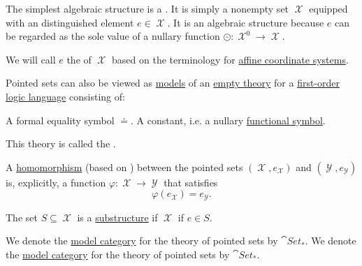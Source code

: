 \begin{definition}\label{def:pointed_set}
  The simplest algebraic structure is a . It is simply a nonempty set \( \mscrX \) equipped with an distinguished element \( e \in \mscrX \). It is an algebraic structure because \( e \) can be regarded as the sole value of a nullary function \( \odot: \mscrX^0 \to \mscrX \).

  We will call \( e \) the  of \( \mscrX \) based on the terminology for \hyperref[def:euclidean_plane_coordinate_system/origin]{affine coordinate systems}.

  \begin{thmenum}
     Pointed sets can also be viewed as \hyperref[def:first_order_semantics/satisfiability]{models} of an \hyperref[def:first_order_semantics/theory]{empty theory} for a \hyperref[def:first_order_language]{first-order logic language} consisting of:
    \begin{thmenum}
       A formal equality symbol \( \doteq \).
       A constant, i.e. a nullary \hyperref[def:first_order_language/func]{functional symbol}.
    \end{thmenum}

    This theory is called the .

     A \hyperref[def:first_order_homomorphism]{homomorphism} (based on ) between the pointed sets \( (\mscrX, e_{\mscrX}) \) and \( (\mscrY, e_{\mscrY}) \) is, explicitly, a function \( \varphi: \mscrX \to \mscrY \) that satisfies
    \begin{equation}\label{eq:def:pointed_set/homomorphism}
      \varphi(e_{\mscrX}) = e_{\mscrY}.
    \end{equation}

     The set \( S \subseteq \mscrX \) is a \hyperref[def:first_order_substructure]{substructure} if \( \mscrX \) if \( e \in S \).

     We denote the \hyperref[def:first_order_model_category]{model category} for the theory of pointed sets by \( \cat{Set}_* \). We denote the \hyperref[def:first_order_model_category]{model category} for the theory of pointed sets by \( \cat{Set}_* \).
  \end{thmenum}
\end{definition}
